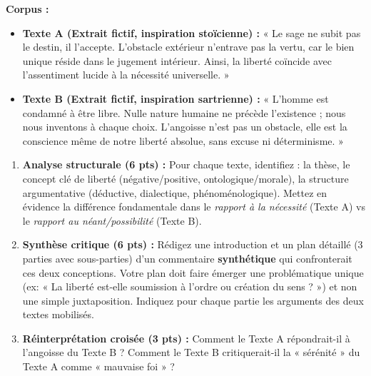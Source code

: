 \documentclass[11pt]{article}
\begin{document}
\begin{exercice}
\textbf{Corpus :}
\begin{itemize}
    \item \textbf{Texte A (Extrait fictif, inspiration stoïcienne) :} « Le sage ne subit pas le destin, il l'accepte. L'obstacle extérieur n'entrave pas la vertu, car le bien unique réside dans le jugement intérieur. Ainsi, la liberté coïncide avec l'assentiment lucide à la nécessité universelle. »
    \item \textbf{Texte B (Extrait fictif, inspiration sartrienne) :} « L'homme est condamné à être libre. Nulle nature humaine ne précède l'existence ; nous nous inventons à chaque choix. L'angoisse n'est pas un obstacle, elle est la conscience même de notre liberté absolue, sans excuse ni déterminisme. »
\end{itemize}

\begin{enumerate}
    \item \textbf{Analyse structurale (6 pts) :} Pour chaque texte, identifiez : la thèse, le concept clé de liberté (négative/positive, ontologique/morale), la structure argumentative (déductive, dialectique, phénoménologique). Mettez en évidence la différence fondamentale dans le \textit{rapport à la nécessité} (Texte A) vs le \textit{rapport au néant/possibilité} (Texte B).
    \item \textbf{Synthèse critique (6 pts) :} Rédigez une introduction et un plan détaillé (3 parties avec sous-parties) d'un commentaire \textbf{synthétique} qui confronterait ces deux conceptions. Votre plan doit faire émerger une problématique unique (ex: « La liberté est-elle soumission à l'ordre ou création du sens ? ») et non une simple juxtaposition. Indiquez pour chaque partie les arguments des deux textes mobilisés.
    \item \textbf{Réinterprétation croisée (3 pts) :} Comment le Texte A répondrait-il à l'angoisse du Texte B ? Comment le Texte B critiquerait-il la « sérénité » du Texte A comme « mauvaise foi » ?
\end{enumerate}
\end{exercice}
\end{document}
